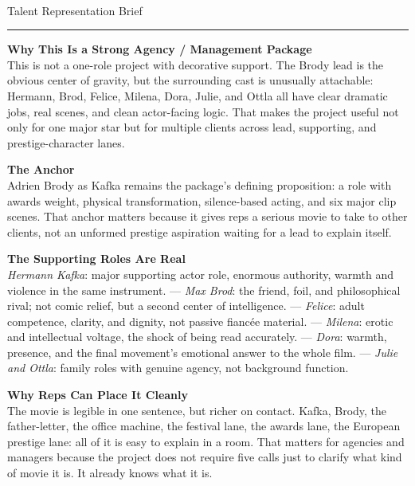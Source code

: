 \documentclass[11pt,letterpaper]{article}
\begin{document}
\begin{center}
{\Large\bfseries\sffamily \filmtitleupper}\\[3pt]
{\normalsize\sffamily\color{kafkagray} Talent Representation Brief}
\end{center}
\vspace{2pt}
\textcolor{sectionrule}{\rule{\textwidth}{0.5pt}}
\vspace{4pt}

\textbf{Why This Is a Strong Agency / Management Package}\\
This is not a one-role project with decorative support. The Brody lead is the obvious center of gravity, but the surrounding cast is unusually attachable: Hermann, Brod, Felice, Milena, Dora, Julie, and Ottla all have clear dramatic jobs, real scenes, and clean actor-facing logic. That makes the project useful not only for one major star but for multiple clients across lead, supporting, and prestige-character lanes.

\vspace{2pt}

\textbf{The Anchor}\\
Adrien Brody as Kafka remains the package's defining proposition: a role with awards weight, physical transformation, silence-based acting, and six major clip scenes. That anchor matters because it gives reps a serious movie to take to other clients, not an unformed prestige aspiration waiting for a lead to explain itself.

\vspace{2pt}

\textbf{The Supporting Roles Are Real}\\
\textit{Hermann Kafka}: major supporting actor role, enormous authority, warmth and violence in the same instrument. --- \textit{Max Brod}: the friend, foil, and philosophical rival; not comic relief, but a second center of intelligence. --- \textit{Felice}: adult competence, clarity, and dignity, not passive fiancée material. --- \textit{Milena}: erotic and intellectual voltage, the shock of being read accurately. --- \textit{Dora}: warmth, presence, and the final movement's emotional answer to the whole film. --- \textit{Julie and Ottla}: family roles with genuine agency, not background function.

\vspace{2pt}

\textbf{Why Reps Can Place It Cleanly}\\
The movie is legible in one sentence, but richer on contact. Kafka, Brody, the father-letter, the office machine, the festival lane, the awards lane, the European prestige lane: all of it is easy to explain in a room. That matters for agencies and managers because the project does not require five calls just to clarify what kind of movie it is. It already knows what it is.
\end{document}
